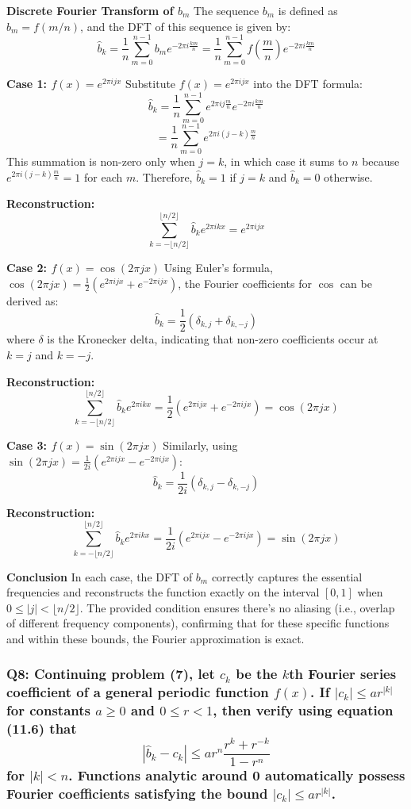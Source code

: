 \documentclass[8pt]{article}
\begin{document}
\textbf{Discrete Fourier Transform of \(b_m\)}
The sequence \(b_m\) is defined as \(b_m = f(m/n)\), and the DFT of this sequence is given by:
\[
\hat{b}_k = \frac{1}{n} \sum_{m=0}^{n-1} b_m e^{-2\pi i \frac{km}{n}} = \frac{1}{n} \sum_{m=0}^{n-1} f\left(\frac{m}{n}\right) e^{-2\pi i \frac{km}{n}}
\]

\textbf{Case 1: \(f(x) = e^{2\pi ijx}\)}
Substitute \(f(x) = e^{2\pi ijx}\) into the DFT formula:
\[
\hat{b}_k = \frac{1}{n} \sum_{m=0}^{n-1} e^{2\pi ij\frac{m}{n}} e^{-2\pi i \frac{km}{n}}
\]
\[
= \frac{1}{n} \sum_{m=0}^{n-1} e^{2\pi i(j-k)\frac{m}{n}}
\]
This summation is non-zero only when \(j = k\), in which case it sums to \(n\) because \(e^{2\pi i(j-k)\frac{m}{n}} = 1\) for each \(m\). Therefore, \(\hat{b}_k = 1\) if \(j = k\) and \(\hat{b}_k = 0\) otherwise.

\textbf{Reconstruction:}
\[
\sum_{k=-\lfloor n/2 \rfloor}^{\lfloor n/2 \rfloor} \hat{b}_k e^{2\pi ikx} = e^{2\pi ijx}
\]

\textbf{Case 2: \(f(x) = \cos(2\pi jx)\)}
Using Euler's formula, \(\cos(2\pi jx) = \frac{1}{2} (e^{2\pi ijx} + e^{-2\pi ijx})\), the Fourier coefficients for \(\cos\) can be derived as:
\[
\hat{b}_k = \frac{1}{2}(\delta_{k, j} + \delta_{k, -j})
\]
where \(\delta\) is the Kronecker delta, indicating that non-zero coefficients occur at \(k = j\) and \(k = -j\).

\textbf{Reconstruction:}
\[
\sum_{k=-\lfloor n/2 \rfloor}^{\lfloor n/2 \rfloor} \hat{b}_k e^{2\pi ikx} = \frac{1}{2} (e^{2\pi ijx} + e^{-2\pi ijx}) = \cos(2\pi jx)
\]

\textbf{Case 3: \(f(x) = \sin(2\pi jx)\)}
Similarly, using \(\sin(2\pi jx) = \frac{1}{2i} (e^{2\pi ijx} - e^{-2\pi ijx})\):
\[
\hat{b}_k = \frac{1}{2i}(\delta_{k, j} - \delta_{k, -j})
\]

\textbf{Reconstruction:}
\[
\sum_{k=-\lfloor n/2 \rfloor}^{\lfloor n/2 \rfloor} \hat{b}_k e^{2\pi ikx} = \frac{1}{2i} (e^{2\pi ijx} - e^{-2\pi ijx}) = \sin(2\pi jx)
\]

\textbf{Conclusion}
In each case, the DFT of \(b_m\) correctly captures the essential frequencies and reconstructs the function exactly on the interval \([0,1]\) when \(0 \leq |j| < \lfloor n/2 \rfloor\). The provided condition ensures there's no aliasing (i.e., overlap of different frequency components), confirming that for these specific functions and within these bounds, the Fourier approximation is exact.

\subsubsection*{Q8:
Continuing problem (7), let \(c_k\) be the \(k\)th Fourier series coefficient of a general periodic function \(f(x)\). If \(|c_k| \leq ar^{|k|}\) for constants \(a \geq 0\) and \(0 \leq r < 1\), then verify using equation (11.6) that
\[
|\hat{b}_k - c_k| \leq ar^n \frac{r^k + r^{-k}}{1 - r^n}
\]
for \(|k| < n\). Functions analytic around 0 automatically possess Fourier coefficients satisfying the bound \(|c_k| \leq ar^{|k|}\).}
\end{document}
